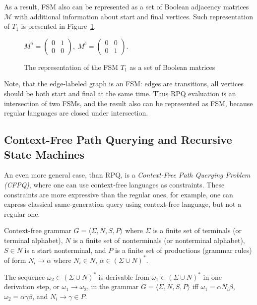 As a result, FSM also can be represented as a set of Boolean adjacency matrices $\mathcal{M}$ with additional information about start and final vertices. Such representation of $T_1$ is presented in Figure~\ref{fig:boolean_decomposition_of_fsm}.
\begin{figure}[h]
	\centering
$
M^a =
\begin{pmatrix}
0&1 \\
0&0
\end{pmatrix},~
M^b =
\begin{pmatrix}
0&0 \\
0&1
\end{pmatrix}.
$ 
\caption{The representation of the FSM $T_1$ as a set of Boolean matrices}
\label{fig:boolean_decomposition_of_fsm}
\end{figure}

Note, that the edge-labeled graph is an FSM: edges are transitions, all vertices should be both start and final at the same time.
Thus RPQ evaluation is an intersection of two FSMs, and the result also can be represented as FSM, because regular languages are closed under intersection.

\subsection{Context-Free Path Querying and Recursive State Machines}

An even more general case, than RPQ, is a \textit{Context-Free Path Querying Problem (CFPQ)}, where one can use context-free languages as constraints. These constraints are more expressive than the regular ones, for example, one can express classical same-generation query using context-free language, but not a regular one.


\begin{definition} 
Context-free grammar $G = \langle\Sigma, N, S, P\rangle$ where $\Sigma$ is a finite set of terminals (or terminal alphabet), $N$ is a finite set of nonterminals (or nonterminal alphabet), $S \in N$ is a start nonterminal, and $P$ is a finite set of productions (grammar rules) of form $N_i \to \alpha$ where  $N_i \in N$, $\alpha \in (\Sigma \cup N)^*$.
\end{definition}

\begin{definition}
The sequence $\omega_2 \in (\Sigma \cup N)^*$ is derivable from $\omega_1 \in (\Sigma \cup N)^*$ in one derivation step, or $\omega_1 \to \omega_2$, in the grammar $G = \langle\Sigma, N, S, P\rangle$ iff $\omega_1=\alpha N_i \beta$, $\omega_2 = \alpha \gamma \beta$, and $N_i \to \gamma \in P$.
\end{definition}

